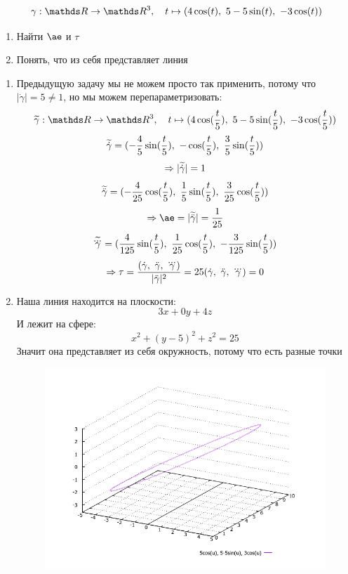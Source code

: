 \documentclass[main]{subfiles}
\begin{document}
    \begin{Example}
      \[\gamma: \R \ra \R^3,\q t \mapsto (4 \cos(t),\ 5-5 \sin(t),\ -3\cos(t))\]
      \begin{enumerate}
        \item Найти $\ae$ и $\tau$
        \item Понять, что из себя представляет линия
      \end{enumerate}
    \end{Example}

    \begin{sol}
      \begin{enumerate}
        \item Предыдущую задачу мы не можем просто так применить, потому что $|\dot{\gamma}|=5 \neq 1$, но мы можем перепараметризовать:
        \[\w{\gamma}: \R \ra \R^3,\q t \mapsto (4 \cos(\frac{t}{5}),\ 5-5 \sin(\frac{t}{5}),\ -3\cos(\frac{t}{5}))\]
        \[\widetilde{\dot{\gamma}} = (-\frac{4}{5} \sin(\frac{t}{5}),\ -\cos(\frac{t}{5}),\ \frac{3}{5} \sin(\frac{t}{5}))\]
        \[\Rightarrow |\widetilde{\dot{\gamma}}|=1\]
        \[\widetilde{\ddot{\gamma}} = (-\frac{4}{25} \cos(\frac{t}{5}),\ \frac{1}{5} \sin(\frac{t}{5}),\ \frac{3}{25} \cos(\frac{t}{5}))\]
        \[\Ra \ae = |\w{\ddot{\gamma}}| = \frac{1}{25}\]
        \[\widetilde{\overset{{}_{\displaystyle ...}}{\gamma}} = (\frac{4}{125} \sin(\frac{t}{5}),\ \frac{1}{25} \cos(\frac{t}{5}),\ -\frac{3}{125} \sin(\frac{t}{5}))\]
        \[\Ra \tau = \frac{(\dot{\gamma},\ \ddot{\gamma},\ \dddot{\gamma})}{|\ddot{\gamma}|^2}=25 (\dot{\gamma},\ \ddot{\gamma},\ \dddot{\gamma})=0\]
        \item Наша линия находится на плоскости:
        \[3x+0y+4z\]
        И лежит на сфере:
        \[x^2+(y-5)^2+z^2=25\]
        Значит она представляет из себя окружность, потому что есть разные точки
        \begin{figure}[H]
            \includegraphics[scale=0.6]{pics/2_2.png}
            \centering
        \end{figure}
      \end{enumerate}
    \end{sol}
\end{document}
